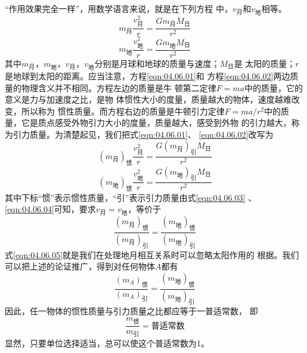 “作用效果完全一样”，用数学语言来说，就是在下列方程
中，$ v_\text{月} $和$v_\text{地}$相等。
\begin{equation}\label{eqn:04.06.01}
	m _ { \text{月} } \frac { v _ { \text{月} } ^ { 2 } } { r } = \frac { G m _ { \text{月} } M _ { \text{日} } } { r ^ { 2 } }  
\end{equation}
\begin{equation}\label{eqn:04.06.02}
	m _ { \text{地} } \frac { v _ { \text{地} } ^ { 2 } } { r } = \frac { G m _ { \text{地} } M _ { \text{日} } } { r ^ { 2 } }  
\end{equation}
其中$ m _ { \text{月} } $，$ m _ { \text{地} } $，$ v _ { \text{月} } $，$ v _ { \text{地} } $分别是月球和地球的质量与速度；$ M _ { \text{日} } $是
太阳的质量；$ r $是地球到太阳的距离。应当注意，方程\eqref{eqn:04.06.01}和
方程\ref{eqn:04.06.02}两边质量的物理含义并不相同。方程左边的质量是牛
顿第二定律$  F = m a   $中的质量，它的意义是力与加速度之比，是物
体惯性大小的度量，质量越大的物体，速度越难改变，所以称为
惯性质量。而方程右边的质量是牛顿引力定律$  F = m a / r ^ { 2 }   $中的质
量，它是质点感受外物引力大小的度量，质量越大，感受到外物
的引力越大，称为引力质量。为清楚起见，我们把式\eqref{eqn:04.06.01}、
\eqref{eqn:04.06.02}改写为
\begin{equation}\label{eqn:04.06.03}
	(m _ { \text{月} }) _ {\text{惯}}
\frac { v _ { \text{月} } ^ 2 } { r } = \frac { G (m _ { \text{月} }) _ {\text{引}} M _ { \text{日} } } { r ^ { 2 } }
\end{equation}
\begin{equation}\label{eqn:04.06.04}
	(m _ { \text{地} }) _ {\text{惯}}
\frac { v _ { \text{地} } ^ 2 } { r } = \frac { G (m _ { \text{地} }) _ {\text{引}} M _ { \text{日} } } { r ^ { 2 } }
\end{equation}
其中下标“惯”表示惯性质量，“引”表示引力质量由式\ref{eqn:04.06.03}
、\ref{eqn:04.06.04}可知，要求$ v _ { \text{月}}=v _ { \text{地} } $，等价于
\begin{equation}\label{eqn:04.06.05}
	\frac { (m _ { \text{月} }) _ {\text{惯}} } { (m _ { \text{月} }) _ {\text{引}} } = \frac { (m _ { \text{地} }) _ {\text{惯}} } { (m _ { \text{地} }) _ {\text{引}} }  
\end{equation}
式\eqref{eqn:04.06.05}就是我们在处理地月相互关系时可以忽略太阳作用的
根据。我们可以把上述的论证推广，得到对任何物体$ A $都有
\begin{equation}\label{eqn:04.06.06}
	\frac { (m _ { A }) _ {\text{惯}} } { (m _ { A }) _ {\text{引}} } = \frac { (m _ { \text{地} }) _ {\text{惯}} } { (m _ { \text{地} }) _ {\text{引}} }  
\end{equation}
因此，任一物体的惯性质量与引力质量之比都应等于一普适常数，
即\vspace{-1.2em}
\begin{equation}\label{eqn:04.06.07}
	\frac { m _ {\text{惯}} } { m _ {\text{引}} } = \text{普适常数}  
\end{equation}
显然，只要单位选择适当，总可以使这个普适常数为1。

